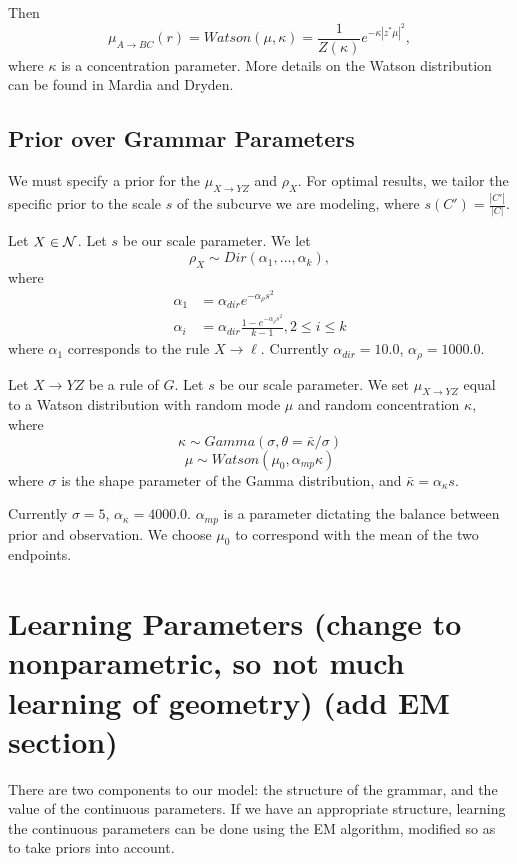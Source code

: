 \documentclass{article}
\newcommand\note[1]{\mar{#1}}
\begin{document}
Then
$$\mu_{A\to BC}(r) = Watson(\mu,\kappa) =
\frac{1}{Z(\kappa)}e^{-\kappa |z^*\mu|^2},$$ where $\kappa$ is a
concentration parameter. More details on the Watson distribution can
be found in Mardia and Dryden.

\subsection{Prior over Grammar Parameters}
\label{sec-prior-param}

\note{?? Why is this good?}

We must specify a prior for the $\mu_{X\to YZ}$ and $\rho_X$.  For
optimal results, we tailor the specific prior to the scale $s$ of the
subcurve we are modeling, where $s(C') = \frac{|C'|}{|C|}$.

Let $X\in {\mathcal N}$. Let $s$ be our scale parameter. We let
$$\rho_X \sim Dir(\alpha_1, \dots, \alpha_k),$$
where
\begin{align*}
\alpha_1 &= \alpha_{dir} e^{- \alpha_{\rho} s^2} \\
\alpha_i &= \alpha_{dir} \frac{1 - e^{- \alpha_{\rho}s^2}}{k-1}, 2\le i\le k
\end{align*}
where $\alpha_1$ corresponds to the rule $X\to \ell$.
Currently $\alpha_{dir} = 10.0$, $\alpha_\rho = 1000.0$.

Let $X\to YZ$ be a rule of $G$. Let $s$ be our scale parameter.  We
set $\mu_{X\to YZ}$ equal to a Watson distribution with random mode $\mu$ and
random concentration $\kappa$, where
$$\kappa \sim Gamma(\sigma, \theta=\bar{\kappa}/\sigma)$$
$$\mu \sim Watson(\mu_0, \alpha_{mp} \kappa)$$
where $\sigma$ is the shape parameter of the Gamma distribution, and
$\bar{\kappa} = \alpha_{\kappa} s$. 

Currently $\sigma=5$, $\alpha_\kappa = 4000.0$. $\alpha_{mp}$ is a
parameter dictating the balance between prior and observation.  We
choose $\mu_0$ to correspond with the mean of the two endpoints.


\section{Learning Parameters (change to nonparametric, so not much learning of geometry) (add EM section)}

There are two components to our model: the structure of the grammar,
and the value of the continuous parameters. If we have an appropriate
structure, learning the continuous parameters can be done using the EM
algorithm, modified so as to take priors into account.
\end{document}
